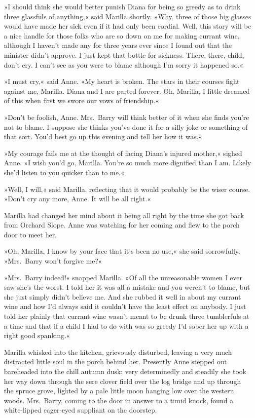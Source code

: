 »I should think she would better punish Diana for being so greedy as to drink three glassfuls of anything,« said Marilla shortly. »Why, three of those big glasses would have made her sick even if it had only been cordial. Well, this story will be a nice handle for those folks who are so down on me for making currant wine, although I haven't made any for three years ever since I found out that the minister didn't approve. I just kept that bottle for sickness. There, there, child, don't cry. I can't see as you were to blame although I'm sorry it happened so.«

»I must cry,« said Anne. »My heart is broken. The stars in their courses fight against me, Marilla. Diana and I are parted forever. Oh, Marilla, I little dreamed of this when first we swore our vows of friendship.«

»Don't be foolish, Anne. Mrs.~Barry will think better of it when she finds you're not to blame. I suppose she thinks you've done it for a silly joke or something of that sort. You'd best go up this evening and tell her how it was.«

»My courage fails me at the thought of facing Diana's injured mother,« sighed Anne. »I wish you'd go, Marilla. You're so much more dignified than I am. Likely she'd listen to you quicker than to me.«

»Well, I will,« said Marilla, reflecting that it would probably be the wiser course. »Don't cry any more, Anne. It will be all right.«

Marilla had changed her mind about it being all right by the time she got back from Orchard Slope. Anne was watching for her coming and flew to the porch door to meet her.

»Oh, Marilla, I know by your face that it's been no use,« she said sorrowfully. »Mrs.~Barry won't forgive me?«

»Mrs.~Barry indeed!« snapped Marilla. »Of all the unreasonable women I ever saw she's the worst. I told her it was all a mistake and you weren't to blame, but she just simply didn't believe me. And she rubbed it well in about my currant wine and how I'd always said it couldn't have the least effect on anybody. I just told her plainly that currant wine wasn't meant to be drunk three tumblerfuls at a time and that if a child I had to do with was so greedy I'd sober her up with a right good spanking.«

Marilla whisked into the kitchen, grievously disturbed, leaving a very much distracted little soul in the porch behind her. Presently Anne stepped out bareheaded into the chill autumn dusk; very determinedly and steadily she took her way down through the sere clover field over the log bridge and up through the spruce grove, lighted by a pale little moon hanging low over the western woods. Mrs.~Barry, coming to the door in answer to a timid knock, found a white-lipped eager-eyed suppliant on the doorstep.

